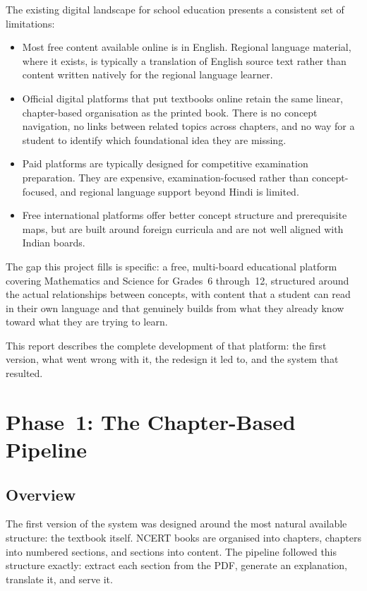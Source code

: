 \documentclass[12pt,a4paper]{article}
\begin{document}
The existing digital landscape for school education presents a consistent set of limitations:

\begin{itemize}[leftmargin=2em, itemsep=0.3em]
  \item Most free content available online is in English. Regional language material,
    where it exists, is typically a translation of English source text rather than content
    written natively for the regional language learner.
  \item Official digital platforms that put textbooks online retain the same linear,
    chapter-based organisation as the printed book. There is no concept navigation,
    no links between related topics across chapters, and no way for a student to identify
    which foundational idea they are missing.
  \item Paid platforms are typically designed for competitive examination preparation.
    They are expensive, examination-focused rather than concept-focused,
    and regional language support beyond Hindi is limited.
  \item Free international platforms offer better concept structure and prerequisite maps,
    but are built around foreign curricula and are not well aligned with Indian boards.
\end{itemize}

The gap this project fills is specific: a free, multi-board educational platform covering
Mathematics and Science for Grades~6 through~12, structured around the actual relationships
between concepts, with content that a student can read in their own language and that
genuinely builds from what they already know toward what they are trying to learn.

This report describes the complete development of that platform: the first version,
what went wrong with it, the redesign it led to, and the system that resulted.

\section{Phase~1: The Chapter-Based Pipeline}

\subsection{Overview}

The first version of the system was designed around the most natural available structure:
the textbook itself.
NCERT books are organised into chapters, chapters into numbered sections,
and sections into content.
The pipeline followed this structure exactly: extract each section from the PDF,
generate an explanation, translate it, and serve it.
\end{document}
